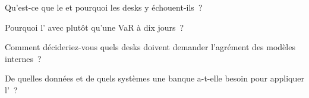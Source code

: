\begin{interviewq}\label{iq:rc:regulatory-capital-for-trading-books:3}
Qu'est-ce que le  et pourquoi les desks y échouent-ils~?
\end{interviewq}

\begin{interviewq}\label{iq:rc:regulatory-capital-for-trading-books:4}
Pourquoi l' avec  plutôt qu'une VaR à dix jours~?
\end{interviewq}

\begin{interviewq}\label{iq:rc:regulatory-capital-for-trading-books:5}
Comment décideriez-vous quels desks doivent demander l'agrément des modèles internes~?
\end{interviewq}

\begin{interviewq}\label{iq:rc:regulatory-capital-for-trading-books:6}
De quelles données et de quels systèmes une banque a-t-elle besoin pour appliquer l'~?
\end{interviewq}

